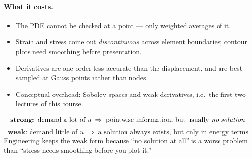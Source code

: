 \paragraph{What it costs.}
\begin{itemize}[leftmargin=1.5em,itemsep=1pt]
  \item The PDE cannot be checked at a point --- only weighted averages of it.
  \item Strain and stress come out \emph{discontinuous} across element
        boundaries; contour plots need smoothing before presentation.
  \item Derivatives are one order less accurate than the displacement, and are
        best sampled at Gauss points rather than nodes.
  \item Conceptual overhead: Sobolev spaces and weak derivatives, i.e.\ the
        first two lectures of this course.
\end{itemize}

\begin{intuition}
\[
  \textbf{strong: } \text{demand a lot of } u \;\Rightarrow\;
  \text{pointwise information, but usually \emph{no solution}}
\]
\[
  \textbf{weak: } \text{demand little of } u \;\Rightarrow\;
  \text{a solution always exists, but only in energy terms}
\]
Engineering keeps the weak form because ``no solution at all'' is a worse
problem than ``stress needs smoothing before you plot it.''
\end{intuition}

